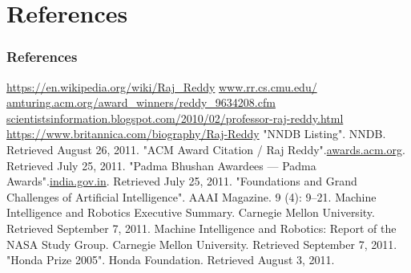 \documentclass{beamer}
\begin{document}
\section{References}
\begin{frame}[allowframebreaks]
 \frametitle{References}
 \begin{thebibliography}{}
  \url {https://en.wikipedia.org/wiki/Raj_Reddy}
  \url {www.rr.cs.cmu.edu/}
  \url {amturing.acm.org/award_winners/reddy_9634208.cfm}
  \url {scientistsinformation.blogspot.com/2010/02/professor-raj-reddy.html}
  \url {https://www.britannica.com/biography/Raj-Reddy}
  "NNDB Listing". NNDB. Retrieved August 26, 2011.
   "ACM Award Citation / Raj Reddy".\url{awards.acm.org}. Retrieved July 25, 2011.
   \framebreak   
    "Padma Bhushan Awardees — Padma Awards".\url{india.gov.in}. Retrieved July 25, 2011.
   "Foundations and Grand Challenges of Artificial Intelligence". AAAI Magazine. 9 (4): 9–21.
  Machine Intelligence and Robotics Executive Summary. Carnegie Mellon University. Retrieved September 7, 2011.
  Machine Intelligence and Robotics: Report of the NASA Study Group. Carnegie
  Mellon University. Retrieved September 7, 2011.
   "Honda Prize 2005". Honda Foundation. Retrieved August 3, 2011.
 \end{thebibliography}

\end{frame}
\end{document}
